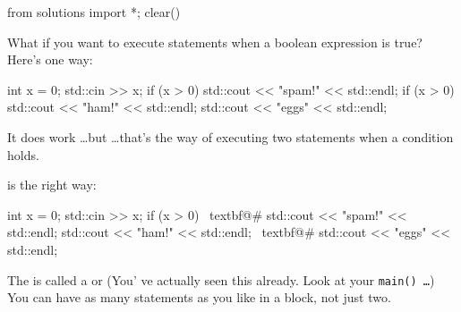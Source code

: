 \begin{python0}
from solutions import *; clear()
\end{python0}

What if you want to execute  statements when a
boolean expression is true? Here's one way:\\
\begin{console}[commandchars=\~\@\#]
int x = 0;
std::cin >> x;
if (x > 0)
   std::cout << "spam!" << std::endl;
if (x > 0)
   std::cout << "ham!" << std::endl;
std::cout << "eggs" << std::endl;
\end{console}

It does work \dots but \dots that's the 
way of executing two statements when a condition holds.

 is the right way:
\begin{console}[commandchars=\~\@\#]
int x = 0;
std::cin >> x;
if (x > 0)
~textbf@{#
        std::cout << "spam!" << std::endl;
        std::cout << "ham!" << std::endl;
~textbf@}#
std::cout << "eggs" << std::endl;
\end{console}

The  is called a  or (You' ve actually seen this already. Look at
your \texttt{main() \dots}) You can have as many statements as you like
in a block, not just two.


